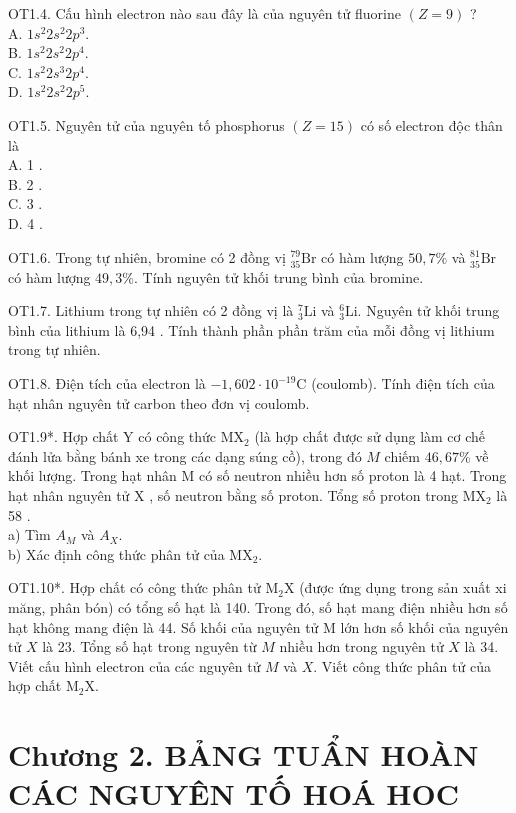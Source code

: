 \documentclass[10pt]{article}
\begin{document}
OT1.4. Cấu hình electron nào sau đây là của nguyên tử fluorine $(Z=9)$ ?\\
A. $1 s^{2} 2 s^{2} 2 p^{3}$.\\
B. $1 s^{2} 2 s^{2} 2 p^{4}$.\\
C. $1 s^{2} 2 s^{3} 2 p^{4}$.\\
D. $1 s^{2} 2 s^{2} 2 p^{5}$.

OT1.5. Nguyên tử của nguyên tố phosphorus $(Z=15)$ có số electron độc thân là\\
A. 1 .\\
B. 2 .\\
C. 3 .\\
D. 4 .

OT1.6. Trong tự nhiên, bromine có 2 đồng vị ${ }_{35}^{79} \mathrm{Br}$ có hàm lượng $50,7 \%$ và ${ }_{35}^{81} \mathrm{Br}$ có hàm lượng $49,3 \%$. Tính nguyên tử khối trung bình của bromine.

OT1.7. Lithium trong tự nhiên có 2 đồng vị là ${ }_{3}^{7} \mathrm{Li}$ và ${ }_{3}^{6} \mathrm{Li}$. Nguyên tử khối trung bình của lithium là 6,94 . Tính thành phần phần trăm của mỗi đồng vị lithium trong tự nhiên.

OT1.8. Điện tích của electron là $-1,602 \cdot 10^{-19} \mathrm{C}$ (coulomb). Tính điện tích của hạt nhân nguyên tử carbon theo đơn vị coulomb.

OT1.9*. Hợp chất Y có công thức $\mathrm{MX}_{2}$ (là hợp chất được sử dụng làm cơ chế đánh lửa bằng bánh xe trong các dạng súng cồ), trong đó $M$ chiếm $46,67 \%$ về khối lượng. Trong hạt nhân M có số neutron nhiều hơn số proton là 4 hạt. Trong hạt nhân nguyên tử X , số neutron bằng số proton. Tổng số proton trong $\mathrm{MX}_{2}$ là 58 .\\
a) Tìm $A_{M}$ và $A_{X}$.\\
b) Xác định công thức phân tử của $\mathrm{MX}_{2}$.

OT1.10*. Hợp chất có công thức phân tử $\mathrm{M}_{2} \mathrm{X}$ (được ứng dụng trong sản xuất xi măng, phân bón) có tổng số hạt là 140. Trong đó, số hạt mang điện nhiều hơn số hạt không mang điện là 44. Số khối của nguyên tử M lớn hơn số khối của nguyên tử $X$ là 23. Tổng số hạt trong nguyên từ $M$ nhiều hơn trong nguyên tử $X$ là 34. Viết cấu hình electron của các nguyên tử $M$ và $X$. Viết công thức phân tử của hợp chất $\mathrm{M}_{2} \mathrm{X}$.

\section*{Chương 2. BẢNG TUẨN HOÀN CÁC NGUYÊN TỐ HOÁ HOC}
\end{document}
